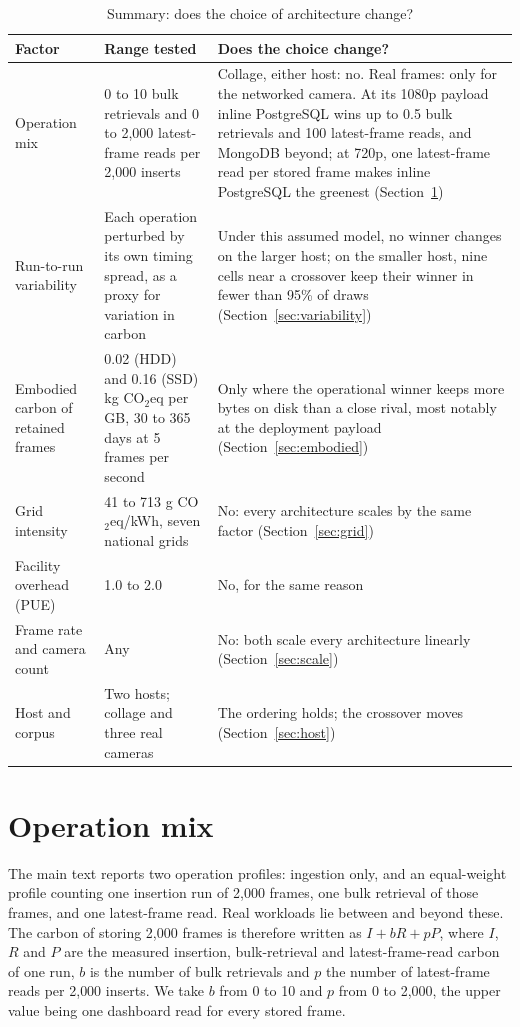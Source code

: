 \documentclass[11pt]{article}
\begin{document}
\begin{table}[htbp]
\centering
\caption{Summary: does the choice of architecture change?}\label{tab:summary}
\small
\begin{tabular}{@{}L{0.19\textwidth}L{0.32\textwidth}L{0.4\textwidth}@{}}
\toprule
Factor & Range tested & Does the choice change? \\
\midrule
Operation mix & 0 to 10 bulk retrievals and 0 to 2{,}000 latest-frame reads per 2{,}000 inserts & Collage, either host: no. Real frames: only for the networked camera. At its 1080p payload inline PostgreSQL wins up to 0.5 bulk retrievals and 100 latest-frame reads, and MongoDB beyond; at 720p, one latest-frame read per stored frame makes inline PostgreSQL the greenest (Section~\ref{sec:mix}) \\
Run-to-run variability & Each operation perturbed by its own timing spread, as a proxy for variation in carbon & Under this assumed model, no winner changes on the larger host; on the smaller host, nine cells near a crossover keep their winner in fewer than 95\% of draws (Section~\ref{sec:variability}) \\
Embodied carbon of retained frames & 0.02 (HDD) and 0.16 (SSD) kg CO$_2$eq per GB, 30 to 365 days at 5 frames per second & Only where the operational winner keeps more bytes on disk than a close rival, most notably at the deployment payload (Section~\ref{sec:embodied}) \\
Grid intensity & 41 to 713 g CO$_2$eq/kWh, seven national grids & No: every architecture scales by the same factor (Section~\ref{sec:grid}) \\
Facility overhead (PUE) & 1.0 to 2.0 & No, for the same reason \\
Frame rate and camera count & Any & No: both scale every architecture linearly (Section~\ref{sec:scale}) \\
Host and corpus & Two hosts; collage and three real cameras & The ordering holds; the crossover moves (Section~\ref{sec:host}) \\
\bottomrule
\end{tabular}
\end{table}

\section{Operation mix}\label{sec:mix}
The main text reports two operation profiles: ingestion only, and an equal-weight profile counting one insertion run of 2{,}000 frames, one bulk retrieval of those frames, and one latest-frame read. Real workloads lie between and beyond these. The carbon of storing 2{,}000 frames is therefore written as $I + bR + pP$, where $I$, $R$ and $P$ are the measured insertion, bulk-retrieval and latest-frame-read carbon of one run, $b$ is the number of bulk retrievals and $p$ the number of latest-frame reads per 2{,}000 inserts. We take $b$ from 0 to 10 and $p$ from 0 to 2{,}000, the upper value being one dashboard read for every stored frame.
\end{document}
